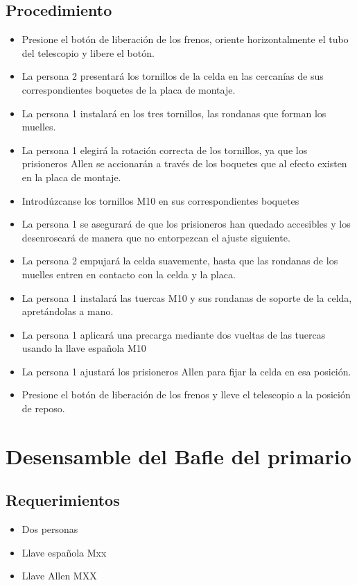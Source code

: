 \subsection{Procedimiento}

\begin{itemize}
\item Presione el botón de liberación de los frenos, oriente horizontalmente el tubo del telescopio y libere el botón. 
\item La persona 2 presentará los tornillos de la celda en las cercanías de sus correspondientes boquetes de la placa de montaje.
\item La persona 1 instalará en los tres tornillos, las rondanas que forman los muelles.
\item La persona 1 elegirá la rotación correcta de los tornillos, ya que los prisioneros Allen se accionarán a través de los boquetes que al efecto existen en la placa de montaje.
\item Introdúzcanse los tornillos M10 en sus correspondientes boquetes 
\item La persona 1 se asegurará de que los prisioneros han quedado accesibles y los desenroscará de manera que no entorpezcan el ajuste siguiente. 
\item La persona 2 empujará la celda suavemente, hasta que las rondanas de los muelles entren en contacto con la celda y la placa.
\item La persona 1 instalará las tuercas M10 y sus rondanas de soporte de la celda, apretándolas a mano.
\item La persona 1 aplicará una precarga mediante dos vueltas de las tuercas usando la llave española M10
\item La persona 1 ajustará los prisioneros Allen para fijar la celda en esa posición.
\item Presione el botón de liberación de los frenos y lleve el telescopio a la posición de reposo.
\end{itemize}

\section{Desensamble del Bafle del primario}

\subsection{Requerimientos}

\begin{itemize}
\item Dos personas
\item Llave española Mxx
\item Llave Allen MXX
\end{itemize}

